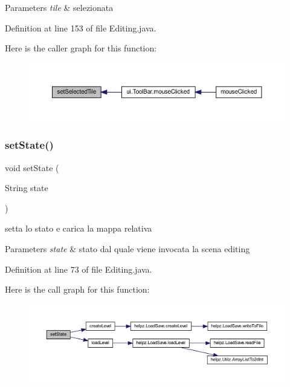 \begin{DoxyParams}{Parameters}
{\em tile} & selezionata \\
\hline
\end{DoxyParams}


Definition at line 153 of file Editing.\+java.

Here is the caller graph for this function\+:\nopagebreak
\begin{figure}[H]
\begin{center}
\leavevmode
\includegraphics[width=350pt]{classscenes_1_1_editing_adaa2adb9d249f9b235fb9bb96aed4924_icgraph}
\end{center}
\end{figure}
\mbox{\label{classscenes_1_1_editing_ae646a5c5937b560efaa2b7bb675bc3cd}} 
\subsubsection{\texorpdfstring{set\+State()}{setState()}}
{\footnotesize\ttfamily void set\+State (\begin{DoxyParamCaption}\item[{String}]{state }\end{DoxyParamCaption})}



setta lo stato e carica la mappa relativa 


\begin{DoxyParams}{Parameters}
{\em state} & stato dal quale viene invocata la scena editing \\
\hline
\end{DoxyParams}


Definition at line 73 of file Editing.\+java.

Here is the call graph for this function\+:\nopagebreak
\begin{figure}[H]
\begin{center}
\leavevmode
\includegraphics[width=350pt]{classscenes_1_1_editing_ae646a5c5937b560efaa2b7bb675bc3cd_cgraph}
\end{center}
\end{figure}


